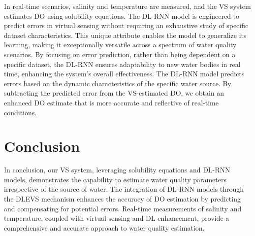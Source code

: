 \documentclass[a4paper, 11pt]{article}
\begin{document}
	In real-time scenarios, salinity and temperature are measured, and the VS system estimates DO using solubility equations. The DL-RNN model is engineered to predict errors in virtual sensing without requiring an exhaustive study of specific dataset characteristics. This unique attribute enables the model to generalize its learning, making it exceptionally versatile across a spectrum of water quality scenarios. By focusing on error prediction, rather than being dependent on a specific dataset, the DL-RNN ensures adaptability to new water bodies in real time, enhancing the system's overall effectiveness. The DL-RNN model predicts errors based on the dynamic characteristics of the specific water source. By subtracting the predicted error from the VS-estimated DO, we obtain an enhanced DO estimate that is more accurate and reflective of real-time conditions.
	
	
	\section*{Conclusion}
	
	In conclusion, our VS system, leveraging solubility equations and DL-RNN models, demonstrates the capability to estimate water quality parameters irrespective of the source of water. The integration of DL-RNN models through the DLEVS mechanism enhances the accuracy of DO estimation by predicting and compensating for potential errors. Real-time measurements of salinity and temperature, coupled with virtual sensing and DL enhancement, provide a comprehensive and accurate approach to water quality estimation.
	
\end{document}
